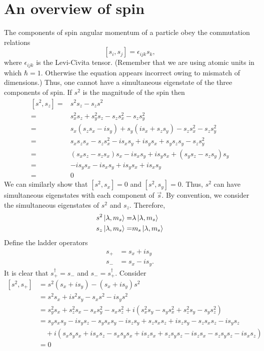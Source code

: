 \section{An overview of spin}
The components of spin angular momentum of a particle obey the commutation 
relations
\begin{equation}\label{c2e137}
[s_i, s_j] = \epsilon_{ijk}s_k, 
\end{equation}
where $\epsilon_{ijk}$ is the Levi-Civita tensor. (Remember that we are using
atomic units in which $\hbar = 1$. Otherwise the equation appears incorrect 
owing to mismatch of dimensions.) Thus, one cannot have a simultaneous 
eigenstate of the three components of spin. If $s^2$ is the magnitude of the 
spin then
\begin{equation}\label{c2e138}
\begin{aligned}
[s^2, s_z] =& s^2 s_z - s_z s^2 \\
=& s_x^2s_z + s_y^2s_z - s_zs_x^2 - s_zs_y^2 \\
=& s_x(s_zs_x - is_y) + s_y(is_x + s_zs_y) - s_zs_x^2 - s_zs_y^2 \\
=& s_xs_zs_x - s_zs_x^2 - is_xs_y + is_ys_x + s_ys_zs_y - s_zs_y^2 \\
=& (s_xs_z - s_zs_x)s_x - is_xs_y + is_ys_x + (s_ys_z - s_zs_y)s_y \\
=& -is_ys_x -is_xs_y + is_ys_x + is_xs_y \\
=& 0
\end{aligned}
\end{equation}
We can similarly show that $[s^2, s_x] = 0$ and $[s^2, s_y] = 0$. Thus, $s^2$
can have simultaneous eigenstates with each component of $\vec{s}$. By 
convention, we consider the simultaneous eigenstates of $s^2$ and $s_z$. 
Therefore,
\begin{equation}\label{c2e139}
\begin{aligned}
s^2\ket{\lambda, m_s} =& \lambda\ket{\lambda, m_s} \\
s_z\ket{\lambda, m_s} =& m_s\ket{\lambda, m_s}
\end{aligned}
\end{equation}
Define the ladder operators
\begin{equation}\label{c2e140}
\begin{aligned}
s_+ &= s_x + is_y \\
s_- &= s_x - is_y.
\end{aligned}
\end{equation}
It is clear that $s_+^\dagger = s_-$ and $s_- = s_+^\dagger$. Consider
\[
\begin{aligned}
[s^2, s_+] &= s^2(s_x + is_y) - (s_x + is_y)s^2 \\
&= s^2s_x + is^2s_y - s_xs^2 - is_ys^2 \\
&= s_y^2s_x + s_z^2s_x - s_xs_y^2 - s_xs_z^2 +i(s_x^2s_y - s_ys_x^2 + s_z^2s_y
   - s_ys_z^2) \\
&= s_ys_xs_y - is_ys_z - s_ys_xs_y - is_zs_y + s_zs_xs_z + is_zs_y - s_zs_xs_z
-is_ys_z \\
&\quad+i(s_xs_ys_x + is_xs_z - s_xs_ys_x + is_zs_x + s_zs_ys_z - is_zs_x
- s_zs_ys_z - is_xs_z) \\
&= 0
\end{aligned}
\]
